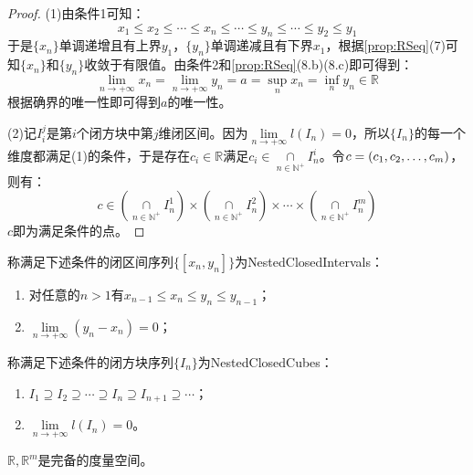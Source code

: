 \begin{proof}
	(1)由条件1可知：
	\begin{equation*}
		x_1\leqslant x_2\leqslant\cdots\leqslant x_n\leqslant\cdots\leqslant y_n\leqslant\cdots\leqslant y_2\leqslant y_1
	\end{equation*}
	于是$\{x_n\}$单调递增且有上界$y_1$，$\{y_n\}$单调递减且有下界$x_1$，根据\cref{prop:RSeq}(7)可知$\{x_n\}$和$\{y_n\}$收敛于有限值。由条件2和\cref{prop:RSeq}(8.b)(8.c)即可得到：
	\begin{equation*}
		\lim_{n\to+\infty}x_n=\lim_{n\to+\infty}y_n=a=\sup_nx_n=\inf_ny_n\in\mathbb{R}
	\end{equation*}
	根据确界的唯一性即可得到$a$的唯一性。\par
	(2)记$I_i^j$是第$i$个闭方块中第$j$维闭区间。因为$\lim\limits_{n\to+\infty}l(I_n)=0$，所以$\{I_n\}$的每一个维度都满足(1)的条件，于是存在$c_i\in\mathbb{R}$满足$c_i\in\underset{n\in\mathbb{N}^+}{\cap}I_n^i$。令$c=(c_1, c_2, \dots, c_{m})$，则有：
	\begin{equation*}
		c\in\left(\underset{n\in\mathbb{N}^+}{\cap}I_n^1\right)\times\left(\underset{n\in\mathbb{N}^+}{\cap}I_n^2\right)\times\cdots\times\left(\underset{n\in\mathbb{N}^+}{\cap}I_n^m\right)
	\end{equation*}
	$c$即为满足条件的点。
\end{proof}
\begin{definition}
	称满足下述条件的闭区间序列$\{[x_n,y_n]\}$为\gls{NestedClosedIntervals}：
	\begin{enumerate}
		\item 对任意的$n>1$有$x_{n-1}\leqslant x_n\leqslant y_n\leqslant y_{n-1}$；
		\item $\lim\limits_{n\to+\infty}(y_n-x_n)=0$；
	\end{enumerate}
	称满足下述条件的闭方块序列$\{I_n\}$为\gls{NestedClosedCubes}：
	\begin{enumerate}
		\item $I_1\supseteq I_2\supseteq\cdots\supseteq I_n\supseteq I_{n+1}\supseteq\cdots$；
		\item $\lim\limits_{n\to+\infty}l(I_n)=0$。
	\end{enumerate}
\end{definition}
\begin{theorem}\label{theo:RnComplete}
	$\mathbb{R},\mathbb{R}^{m}$是完备的度量空间。
\end{theorem}
